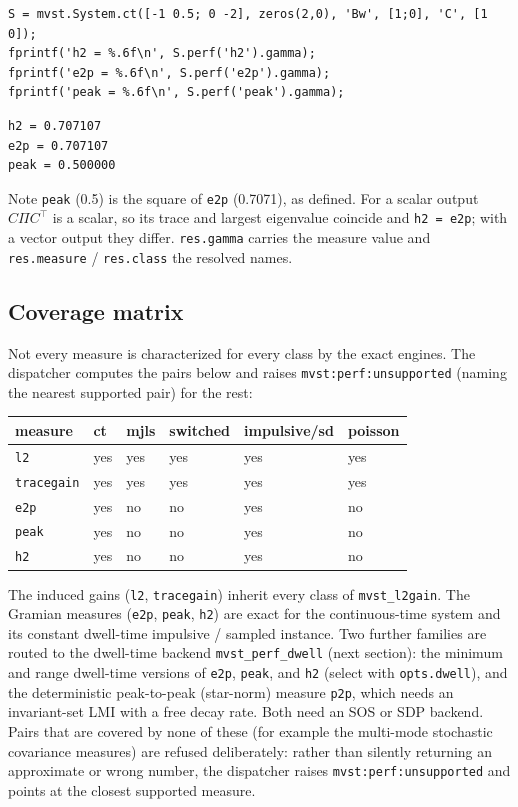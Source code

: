 \documentclass[11pt,oneside]{report}
\newcommand{\code}[1]{\texttt{#1}}
\begin{document}
\begin{lstlisting}[style=matlabstyle]
S = mvst.System.ct([-1 0.5; 0 -2], zeros(2,0), 'Bw', [1;0], 'C', [1 0]);
fprintf('h2 = %.6f\n', S.perf('h2').gamma);
fprintf('e2p = %.6f\n', S.perf('e2p').gamma);
fprintf('peak = %.6f\n', S.perf('peak').gamma);
\end{lstlisting}

\begin{lstlisting}[style=outputstyle]
h2 = 0.707107
e2p = 0.707107
peak = 0.500000
\end{lstlisting}

Note \code{peak} (0.5) is the square of \code{e2p} (0.7071), as defined. For a scalar
output \(C\Pi C^\top\) is a scalar, so its trace and largest eigenvalue coincide
and \code{h2 = e2p}; with a vector output they differ. \code{res.gamma} carries the measure
value and \code{res.measure} / \code{res.class} the resolved names.

\hypertarget{coverage-matrix}{%
\subsection{Coverage matrix}\label{coverage-matrix}}

Not every measure is characterized for every class by the exact engines. The
dispatcher computes the pairs below and raises \code{mvst:perf:unsupported} (naming
the nearest supported pair) for the rest:

\begin{longtable}[]{@{}llllll@{}}
\toprule
measure & ct & mjls & switched & impulsive/sd & poisson \\
\midrule
\endhead
\code{l2} & yes & yes & yes & yes & yes \\
\code{tracegain} & yes & yes & yes & yes & yes \\
\code{e2p} & yes & no & no & yes & no \\
\code{peak} & yes & no & no & yes & no \\
\code{h2} & yes & no & no & yes & no \\
\bottomrule
\end{longtable}

The induced gains (\code{l2}, \code{tracegain}) inherit every class of \code{mvst\_l2gain}. The
Gramian measures (\code{e2p}, \code{peak}, \code{h2}) are exact for the continuous-time system
and its constant dwell-time impulsive / sampled instance. Two further families
are routed to the dwell-time backend \code{mvst\_perf\_dwell} (next section): the
minimum and range dwell-time versions of \code{e2p}, \code{peak}, and \code{h2} (select with
\code{opts.dwell}), and the deterministic peak-to-peak (star-norm) measure \code{p2p},
which needs an invariant-set LMI with a free decay rate. Both need an SOS or SDP
backend. Pairs that are covered by none of these (for example the multi-mode
stochastic covariance measures) are refused deliberately: rather than silently
returning an approximate or wrong number, the dispatcher raises
\code{mvst:perf:unsupported} and points at the closest supported measure.
\end{document}
